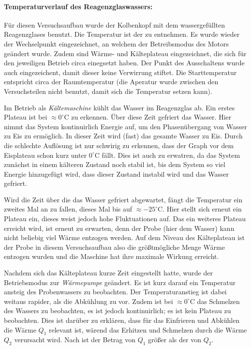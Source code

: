 \paragraph{Temperaturverlauf des Reagenzglaswassers:}
Für diesen Versuchsaufbau wurde der Kolbenkopf mit dem wassergefüllten Reagenzglases benutzt. Die Temperatur ist der  zu entnehmen. Es wurde wieder der Wechselpunkt eingezeichnet, an welchem der Betreibsmodus des Motors geändert wurde. Zudem sind Wärme- und Kälteplateau eingezeichnet, die sich für den jeweiligen Betrieb circa einegsetzt haben. Der Punkt des Ausschaltens wurde auch eingezeichent, damit dieser keine Verwirrung stiftet.
Die Starttemperatur entspricht circa der Raumtemperatur (die Aperatur wurde zwischen den Versuchsteilen nicht benutzt, damit sich die Temperatur setzen kann).

Im Betrieb als \emph{Kältemaschine} kühlt das Wasser im Reagenzglas ab. Ein erstes Plateau ist bei $\approx 0 ^\circ$C zu erkennen. Über diese Zeit gefriert das Wasser. Hier nimmt das System kontinuirlich Energie auf, um den Phasenübergang von Wasser zu Eis zu ermöglich. In dieser Zeit wird (fast) das gesamte Wasser zu Eis.
Durch die schlechte Auflösung ist nur schwirig zu erkennen, dass der Graph vor dem Eisplateau schon kurz unter $0^\circ$C fällt. Dies ist auch zu erwatren, da das System zunächst in einem kälteren Zustand noch stabil ist, bis dem System so viel Energie hinzugefügt wird, dass dieser Zustand instabil wird und das Wasser gefriert. 

Wird die Zeit über die das Wasser gefriert abgewartet, fängt die Temperatur ein zweites Mal an zu fallen, dieses Mal bis auf $\approx -25 ^\circ$C. Hier stellt sich erneut ein Plateau ein, dieses weist jedoch hohe Fluktuationen auf. Das ein weiteres Plateau erreicht wird, ist erneut zu erwarten, denn der Probe (hier dem Wasser) kann nicht beliebig viel Wärme entzogen werden. Auf dem Niveau des Kälteplateau ist der Probe in diesem Versuchsaufbau also die größtmögliche Menge Wärme entzogen wurden und die Maschine hat ihre maximale Wirkung erreicht.

Nachdem sich das Kälteplateau kurze Zeit eingestellt hatte, wurde der Betriebsmodus zur \emph{Wärmepumpe} geändert. Es ist kurz darauf ein Temperatur ansteig des Probenwassers zu beobachten. Der Temperaturanstieg ist dabei weitaus rapider, als die Abkühlung zu vor. Zudem ist bei $\approx 0 ^\circ$C das Schmelzen des Wassers zu beobachten, es ist jedoch kontinuirlich; es ist kein Plateau zu beobachten. 
Dies ist darüber zu erklären, dass für das Einfrieren und Abkühlen die Wärme $Q_1$ relevant ist, wärend das Erhitzen und Schmelzen durch die Wärme $Q_2$ verursacht wird. Nach  ist der Betrag von $Q_1$ größer als der von $Q_2$.

